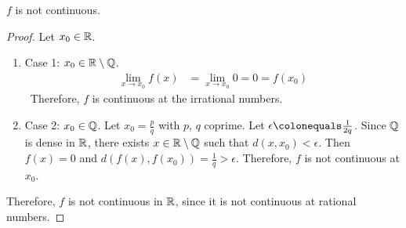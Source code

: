 \begin{problem}
\begin{enumroman}
      \begin{answer}
        $f$ is not continuous.
        \begin{proof}
          Let $x_0 \in \mathbb{R}$.
          \begin{enumerate}
            \item Case 1: $x_0 \in \mathbb{R} \setminus \mathbb{Q}$.
              \begin{align*}
                \lim_{x \to x_0}{f(x)} &= \lim_{x \to x_0}{0} = 0 = f(x_0)
              \end{align*}\
              Therefore, $f$ is continuous at the irrational numbers.
            \item Case 2: $x_0 \in \mathbb{Q}$.
              Let $x_0 = \frac{p}{q}$ with $p$, $q$ coprime.
              Let $\epsilon \colonequals \frac{1}{2q}$.
              Since $\mathbb{Q}$ is dense in $\mathbb{R}$, there exists $x \in \mathbb{R} \setminus \mathbb{Q}$
              such that $d(x, x_0) < \epsilon$.
              Then $f(x) = 0$ and $d(f(x), f(x_0)) = \frac{1}{q} > \epsilon$.
              Therefore, $f$ is not continuous at $x_0$.
          \end{enumerate}
          Therefore, $f$ is not continuous in $\mathbb{R}$, since it is not continuous
          at rational numbers.
        \end{proof}
      \end{answer}
  \end{enumroman}
\end{problem}
